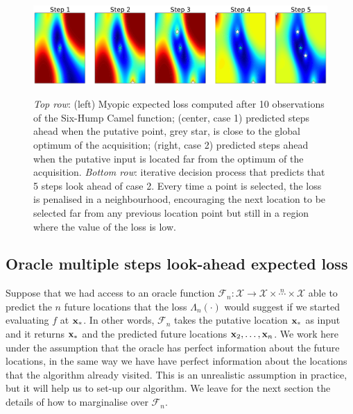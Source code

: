 \documentclass[twoside]{article}
\newcommand{\future}{\mathcal{F}}
\begin{document}
\begin{figure}[t!]
\begin{center}\label{fig:steps_ahead}
\includegraphics[width=16cm]{steps.pdf}
\end{center}\caption{\emph{Top row}: (left) Myopic expected loss computed after 10 observations of the Six-Hump Camel function; (center, case 1) predicted steps ahead when the putative point, grey star, is close to the global optimum of the acquisition; (right, case 2) predicted steps ahead when the putative input is located far from the optimum of the acquisition. \emph{Bottom row}: iterative decision process that predicts that 5 steps look ahead of case 2. Every time a point is selected, the loss is penalised in a neighbourhood, encouraging the next location to be selected far from any previous location point but still in a region where the value of the loss is low.}
\end{figure}

\subsection{Oracle multiple steps look-ahead expected loss}



Suppose that  we had access to an oracle function $\future_{n}: {\mathcal X}\rightarrow  {\mathcal X}\times \overset{n}{\cdots}\times {\mathcal X}$ able to predict the $n$ future  locations that the loss $\Lambda_n(\cdot)$ would suggest if we started evaluating $f$ at $\mathbf{x}_*$. In other words, $\future_{n}$ takes the putative location $\mathbf{x}_*$ as input and it returns $\mathbf{x}_*$ and the predicted future locations  $\mathbf{x}_2,\dots, \mathbf{x}_n$. We work here under the assumption that the oracle has perfect information about the future locations, in the same way we have have perfect information about the locations that the algorithm already visited. This is an unrealistic assumption in practice, but it will help us to set-up our algorithm. We leave for the next section the details of how to marginalise over $\future_{n}$. 
\end{document}

